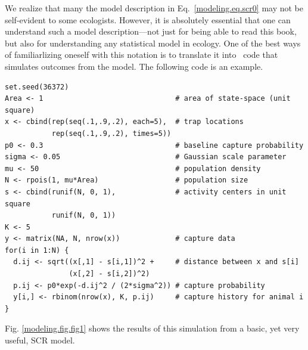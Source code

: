 We realize that many the model description in Eq.~\ref{modeling.eq.scr0} may not be
self-evident to some ecologists. However, it is absolutely essential
that one can understand such a model description---not just for being
able to read this book, but also for understanding any statistical
model in ecology. One of the best ways of familiarlizing oneself with
this notation is to translate it into \R~code that simulates outcomes
from the model. The following code is an example.
\begin{small}
\begin{verbatim}
set.seed(36372)
Area <- 1                               # area of state-space (unit square)
x <- cbind(rep(seq(.1,.9,.2), each=5),  # trap locations
           rep(seq(.1,.9,.2), times=5))
p0 <- 0.3                               # baseline capture probability
sigma <- 0.05                           # Gaussian scale parameter
mu <- 50                                # population density
N <- rpois(1, mu*Area)                  # population size
s <- cbind(runif(N, 0, 1),              # activity centers in unit square
           runif(N, 0, 1))
K <- 5
y <- matrix(NA, N, nrow(x))             # capture data
for(i in 1:N) {
  d.ij <- sqrt((x[,1] - s[i,1])^2 +     # distance between x and s[i]
               (x[,2] - s[i,2])^2)
  p.ij <- p0*exp(-d.ij^2 / (2*sigma^2)) # capture probability
  y[i,] <- rbinom(nrow(x), K, p.ij)     # capture history for animal i
}
\end{verbatim}
\end{small}
Fig. \ref{modeling.fig.fig1} shows the results of this simulation from a
basic, yet very useful, SCR model.


